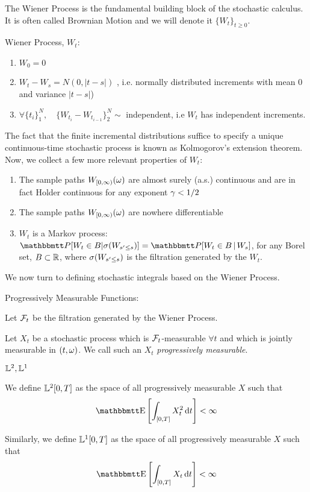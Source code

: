 The Wiener Process is the fundamental building block of the stochastic calculus. 
It is often called Brownian Motion and we will denote it $\{W_t\}_{t\geq 0}$. 
\begin{defn}Wiener Process, $W_t$:
\begin{enumerate}
  \item $W_0 = 0$
  \item $W_t - W_s = N(0, |t-s|)$ , i.e. normally distributed increments with
  mean 0 and variance $|t-s|$)
  \item $\forall \{t_i\}_1^N, \quad \{W_{t_i} - W_{t_{i-1}} \}_2^N \sim$
  independent, i.e $W_t$ has independent increments.
\end{enumerate}
\end{defn}
The fact that the finite incremental distributions suffice to specify a unique
continuous-time stochastic process is known as Kolmogorov's extension theorem.
Now, we collect a few more relevant properties of $W_t$:
\begin{enumerate}
  \item The sample paths $W_{[0,\infty)}({\omega})$
are almost surely (a.s.) continuous and are in fact Holder continuous for any
exponent ${\gamma } < 1/2$
\item The sample paths $W_{[0,\infty)}({\omega})$ are nowhere differentiable
\item $W_t$ is a Markov process: $\Prob[W_t \in B | \s(W_{s' \leq s })] =
\Prob[W_t \in B \,| \,W_s]$, for any Borel set, $B \subset { \mathbb{R} }$, where $\sigma(W_{s'
\leq s })$ is the filtration generated by the $W_t$.
\end{enumerate}

We now turn to defining stochastic integrals based on the Wiener Process.
 
\begin{defn} Progressively Measurable Functions:

Let ${\mathcal{F}}_t$ be the filtration generated by the Wiener Process.

Let $X_t$ be a stochastic process which is ${\mathcal{F}}_t$-measurable $\forall t$ and
which is jointly measurable in $(t,{\omega})$. We call such an $X_t$
\emph{progressively measurable}.
\end{defn}

\begin{defn} ${\mathbb{L}^2}, {\mathbb{L}^1}$

We define ${\mathbb{L}^2}[0,T]$ as the space of all progressively measurable
$X$ such that
\begin{equation*}
\Exp \left[ \int_{[0,T]} X_t^2 \intd{t} \right] < \infty
\end{equation*}

Similarly, we define ${\mathbb{L}^1}[0,T]$ as the space of all progressively measurable
$X$ such that
\begin{equation*}
\Exp \left[ \int_{[0,T]} X_t \intd{t} \right] < \infty
\end{equation*} 
\end{defn}

